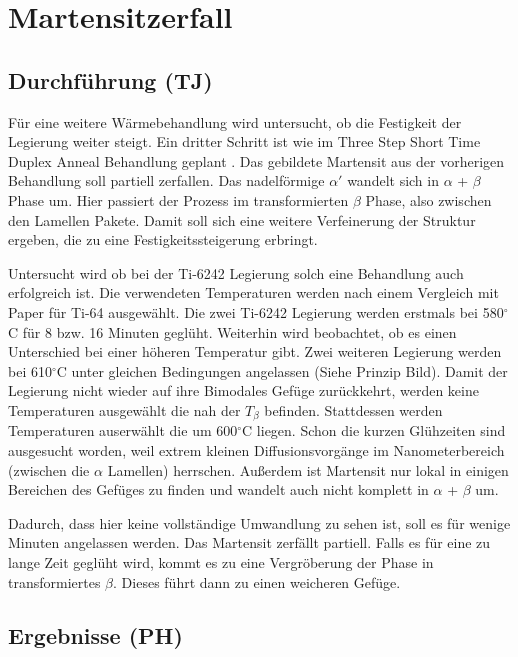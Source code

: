\chapter{Martensitzerfall}

\section{Durchführung (TJ)}

Für eine weitere Wärmebehandlung wird untersucht, ob die Festigkeit der Legierung weiter steigt. Ein dritter Schritt ist wie im Three Step Short Time Duplex Anneal Behandlung geplant \cite{Morita.2005}. Das gebildete Martensit aus der vorherigen Behandlung soll partiell zerfallen. Das nadelförmige $\alpha'$ wandelt sich in $\alpha$ + $\beta$ Phase um. Hier passiert der Prozess im transformierten $\beta$ Phase, also zwischen den Lamellen Pakete. Damit soll sich eine weitere Verfeinerung der Struktur ergeben, die zu eine Festigkeitssteigerung erbringt.

Untersucht wird ob bei der Ti-6242 Legierung solch eine Behandlung auch erfolgreich ist. Die verwendeten Temperaturen werden nach einem Vergleich mit Paper für Ti-64 \cite{Morita.2005} ausgewählt. Die zwei Ti-6242 Legierung werden erstmals bei 580$^\circ$C für 8 bzw. 16 Minuten geglüht. Weiterhin wird beobachtet, ob es einen Unterschied bei einer höheren Temperatur gibt. Zwei weiteren Legierung werden bei 610$^\circ$C unter gleichen Bedingungen angelassen (Siehe Prinzip Bild). Damit der Legierung nicht wieder auf ihre Bimodales Gefüge zurückkehrt, werden keine Temperaturen ausgewählt die nah der $T_{\beta}$ befinden. Stattdessen werden Temperaturen auserwählt die um 600$^\circ$C liegen. Schon die kurzen Glühzeiten sind  ausgesucht worden, weil extrem kleinen Diffusionsvorgänge im Nanometerbereich (zwischen die $\alpha$ Lamellen) herrschen. Außerdem ist Martensit nur lokal in einigen Bereichen des Gefüges zu finden und wandelt auch nicht komplett in $\alpha$ + $\beta$ um.

Dadurch, dass hier keine vollständige Umwandlung zu sehen ist, soll es für wenige Minuten angelassen werden. Das Martensit zerfällt partiell. Falls es für eine zu lange Zeit geglüht wird, kommt es zu eine Vergröberung der Phase in transformiertes $\beta$. Dieses führt dann zu einen weicheren Gefüge.

\section{Ergebnisse (PH)}

